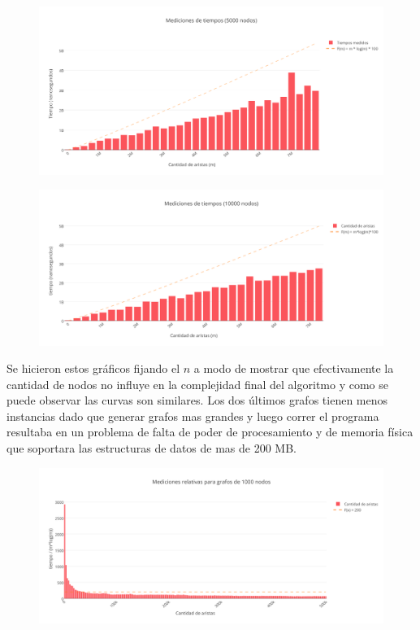 \begin{figure}[h!]
	\centering
 	\includegraphics[scale=0.6]{imagenes/ej3/tiempos5000B.png}
 \end{figure}

 \begin{figure}[h!]
	\centering
 	\includegraphics[scale=0.6]{imagenes/ej3/tiempos10000B.png}
 \end{figure}

 Se hicieron estos gráficos fijando el $n$ a modo de mostrar que efectivamente la cantidad de nodos no influye en la complejidad final del algoritmo y como se puede observar las curvas son similares. Los dos últimos grafos tienen menos instancias dado que generar grafos mas grandes y luego correr el programa resultaba en un problema de falta de poder de procesamiento y de memoria física que soportara las estructuras de datos de mas de 200 MB.

\newpage

 \begin{figure}[h!]
	\centering
 	\includegraphics[scale=0.6]{imagenes/ej3/mlogm1000B.png}
 \end{figure}

